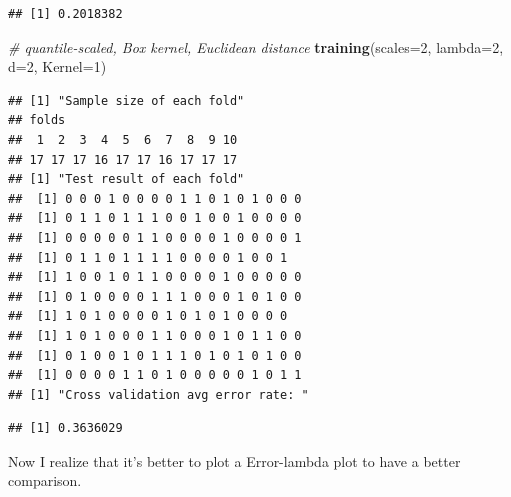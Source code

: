 \documentclass[12pt]{article}
\newenvironment{Shaded}{\begin{snugshade}}{\end{snugshade}}
\newcommand{\AttributeTok}[1]{\textcolor[rgb]{0.13,0.29,0.53}{#1}}
\newcommand{\CommentTok}[1]{\textcolor[rgb]{0.56,0.35,0.01}{\textit{#1}}}
\newcommand{\DecValTok}[1]{\textcolor[rgb]{0.00,0.00,0.81}{#1}}
\newcommand{\FunctionTok}[1]{\textcolor[rgb]{0.13,0.29,0.53}{\textbf{#1}}}
\newcommand{\NormalTok}[1]{#1}
\begin{document}
\begin{verbatim}
## [1] 0.2018382
\end{verbatim}

\begin{Shaded}
\begin{Highlighting}[]
\CommentTok{\# quantile{-}scaled, Box kernel, Euclidean distance}
\FunctionTok{training}\NormalTok{(}\AttributeTok{scales=}\DecValTok{2}\NormalTok{, }\AttributeTok{lambda=}\DecValTok{2}\NormalTok{, }\AttributeTok{d=}\DecValTok{2}\NormalTok{, }\AttributeTok{Kernel=}\DecValTok{1}\NormalTok{)}
\end{Highlighting}
\end{Shaded}

\begin{verbatim}
## [1] "Sample size of each fold"
## folds
##  1  2  3  4  5  6  7  8  9 10 
## 17 17 17 16 17 17 16 17 17 17 
## [1] "Test result of each fold"
##  [1] 0 0 0 1 0 0 0 0 1 1 0 1 0 1 0 0 0
##  [1] 0 1 1 0 1 1 1 0 0 1 0 0 1 0 0 0 0
##  [1] 0 0 0 0 0 1 1 0 0 0 0 1 0 0 0 0 1
##  [1] 0 1 1 0 1 1 1 1 0 0 0 0 1 0 0 1
##  [1] 1 0 0 1 0 1 1 0 0 0 0 1 0 0 0 0 0
##  [1] 0 1 0 0 0 0 1 1 1 0 0 0 1 0 1 0 0
##  [1] 1 0 1 0 0 0 0 1 0 1 0 1 0 0 0 0
##  [1] 1 0 1 0 0 0 1 1 0 0 0 1 0 1 1 0 0
##  [1] 0 1 0 0 1 0 1 1 1 0 1 0 1 0 1 0 0
##  [1] 0 0 0 0 1 1 0 1 0 0 0 0 0 1 0 1 1
## [1] "Cross validation avg error rate: "
\end{verbatim}

\begin{verbatim}
## [1] 0.3636029
\end{verbatim}

Now I realize that it's better to plot a Error-lambda plot to have a
better comparison.
\end{document}
